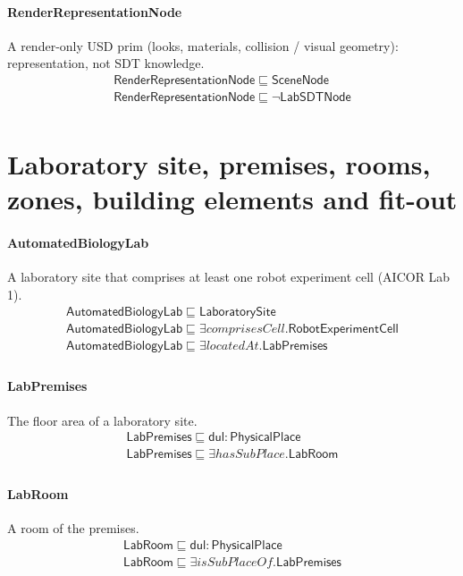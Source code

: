 \documentclass[10pt]{article}
\begin{document}
\paragraph{RenderRepresentationNode} A render-only USD prim (looks, materials, collision / visual geometry): representation, not SDT knowledge.
\[\begin{array}{l}
\mathsf{RenderRepresentationNode} \sqsubseteq  \mathsf{SceneNode} \\
\mathsf{RenderRepresentationNode} \sqsubseteq  \neg \mathsf{LabSDTNode} \\
\end{array}\]
\section*{Laboratory site, premises, rooms, zones, building elements and fit-out}
\paragraph{AutomatedBiologyLab} A laboratory site that comprises at least one robot experiment cell (AICOR Lab 1).
\[\begin{array}{l}
\mathsf{AutomatedBiologyLab} \sqsubseteq  \mathsf{LaboratorySite} \\
\mathsf{AutomatedBiologyLab} \sqsubseteq  \exists \mathit{comprisesCell}.\mathsf{RobotExperimentCell} \\
\mathsf{AutomatedBiologyLab} \sqsubseteq  \exists \mathit{locatedAt}.\mathsf{LabPremises} \\
\end{array}\]
\paragraph{LabPremises} The floor area of a laboratory site.
\[\begin{array}{l}
\mathsf{LabPremises} \sqsubseteq  \mathsf{dul{:}PhysicalPlace} \\
\mathsf{LabPremises} \sqsubseteq  \exists \mathit{hasSubPlace}.\mathsf{LabRoom} \\
\end{array}\]
\paragraph{LabRoom} A room of the premises.
\[\begin{array}{l}
\mathsf{LabRoom} \sqsubseteq  \mathsf{dul{:}PhysicalPlace} \\
\mathsf{LabRoom} \sqsubseteq  \exists \mathit{isSubPlaceOf}.\mathsf{LabPremises} \\
\end{array}\]
\end{document}
